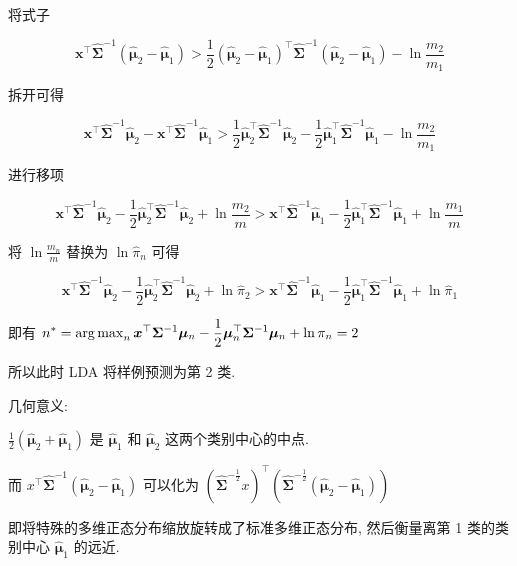 \documentclass[answers]{exam}  %
\begin{document}
\begin{questions}
\begin{solution}
\begin{enumerate}
            将式子

            $$
              \bm{x}^{\top}\hat{\bm{\Sigma}}^{-1}(\hat{\bm{\mu}}_{2}-\hat{\bm{\mu}}_{1}) > \frac{1}{2}(\hat{\bm{\mu}}_{2}-\hat{\bm{\mu}}_{1})^{\top}\hat{\bm{\Sigma}}^{-1}(\hat{\bm{\mu}}_{2} - \hat{\bm{\mu}}_{1}) - \ln \frac{m_{2}}{m_{1}}
            $$

            拆开可得

            $$
              \bm{x}^{\top}\hat{\bm{\Sigma}}^{-1}\hat{\bm{\mu}}_{2} - \bm{x}^{\top}\hat{\bm{\Sigma}}^{-1}\hat{\bm{\mu}}_{1} > \frac{1}{2}\hat{\bm{\mu}}_{2}^{\top}\hat{\bm{\Sigma}}^{-1}\hat{\bm{\mu}}_{2} - \frac{1}{2}\hat{\bm{\mu}}_{1}^{\top}\hat{\bm{\Sigma}}^{-1}\hat{\bm{\mu}}_{1}-\ln \frac{m_{2}}{m_{1}}
            $$

            进行移项

            $$
              \bm{x}^{\top}\hat{\bm{\Sigma}}^{-1}\hat{\bm{\mu}}_{2}-\frac{1}{2}\hat{\bm{\mu}}_{2}^{\top}\hat{\bm{\Sigma}}^{-1}\hat{\bm{\mu}}_{2}+\ln \frac{m_{2}}{m} > \bm{x}^{\top}\hat{\bm{\Sigma}}^{-1}\hat{\bm{\mu}}_{1}-\frac{1}{2}\hat{\bm{\mu}}_{1}^{\top}\hat{\bm{\Sigma}}^{-1}\hat{\bm{\mu}}_{1}+\ln \frac{m_{1}}{m}
            $$

            将 $\displaystyle \ln \frac{m_{n}}{m}$ 替换为 $\ln \hat{\pi}_{n}$ 可得

            $$
              \bm{x}^{\top}\hat{\bm{\Sigma}}^{-1}\hat{\bm{\mu}}_{2}-\frac{1}{2}\hat{\bm{\mu}}_{2}^{\top}\hat{\bm{\Sigma}}^{-1}\hat{\bm{\mu}}_{2}+\ln \hat{\pi}_{2} > \bm{x}^{\top}\hat{\bm{\Sigma}}^{-1}\hat{\bm{\mu}}_{1}-\frac{1}{2}\hat{\bm{\mu}}_{1}^{\top}\hat{\bm{\Sigma}}^{-1}\hat{\bm{\mu}}_{1}+\ln \hat{\pi}_{1}
            $$

            即有 $\displaystyle n^{*} = \operatorname{arg\,max}_{n} \bm{x}^{\top}\bm{\Sigma}^{-1}\bm{\mu}_{n}-\frac{1}{2}\bm{\mu}_{n}^{\top}\bm{\Sigma}^{-1}\bm{\mu}_{n}+\ln \pi_{n} = 2$

            所以此时 LDA 将样例预测为第 2 类.

            几何意义:

            $\displaystyle \frac{1}{2}(\hat{\bm{\mu}}_{2}+\hat{\bm{\mu}}_{1})$ 是 $\hat{\bm{\mu}}_{1}$ 和 $\hat{\bm{\mu}}_{2}$ 这两个类别中心的中点.

            而 $x^{\top}\hat{\bm{\Sigma}}^{-1}(\hat{\bm{\mu}}_{2}-\hat{\bm{\mu}}_{1})$ 可以化为 $(\hat{\bm{\Sigma}}^{-\frac{1}{2}}x)^{\top}(\hat{\bm{\Sigma}}^{-\frac{1}{2}}(\hat{\bm{\mu}}_{2}-\hat{\bm{\mu}}_{1}))$

            即将特殊的多维正态分布缩放旋转成了标准多维正态分布, 然后衡量离第 1 类的类别中心 $\hat{\bm{\mu}}_{1}$ 的远近.


\end{enumerate}
\end{solution}
\end{questions}
\end{document}

